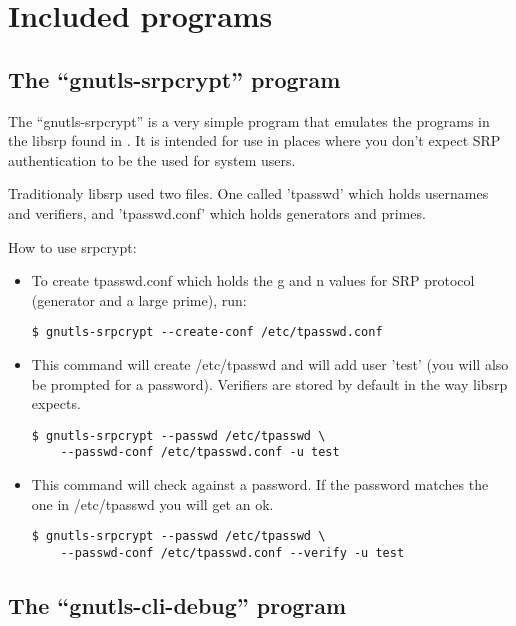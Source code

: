 \chapter{Included programs}

\section{The ``gnutls-srpcrypt'' program}
\label{srpcrypt}

The ``gnutls-srpcrypt'' is a very simple program that emulates the programs in the libsrp 
found in .
It is intended for use in places where you don't expect SRP
authentication to be the used for system users.

Traditionaly libsrp used two files. One called 'tpasswd' which holds usernames 
and verifiers, and 'tpasswd.conf' which holds generators and primes.
\par
How to use srpcrypt:

\begin{itemize}


\item To create tpasswd.conf which holds the g and n values for
SRP protocol (generator and a large prime), run:
\begin{verbatim}
$ gnutls-srpcrypt --create-conf /etc/tpasswd.conf
\end{verbatim}


\item This command will create /etc/tpasswd and will add user 'test' (you will also
be prompted for a password). Verifiers are stored by default in the
way libsrp expects.
\begin{verbatim}
$ gnutls-srpcrypt --passwd /etc/tpasswd \ 
    --passwd-conf /etc/tpasswd.conf -u test
\end{verbatim}

\item This command will check against a password. If the password matches 
the one in /etc/tpasswd you will get an ok.
\begin{verbatim}
$ gnutls-srpcrypt --passwd /etc/tpasswd \ 
    --passwd-conf /etc/tpasswd.conf --verify -u test
\end{verbatim}

\end{itemize}



\section{The ``gnutls-cli-debug'' program}

